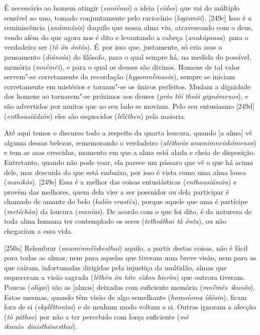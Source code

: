 É necessário ao homem atingir (\emph{suniénai}) a ideia (\emph{eîdos})
que vai do múltiplo sensível ao uno, tomado conjuntamente pelo
raciocínio (\emph{logismôi}). [249c] Isso é a reminiscência
(\emph{anámnêsis}) daquilo que nossa alma viu, atravessando com o deus,
vendo além do que agora nos é dito e levantando a cabeça
(\emph{anakúpsasa})~para o verdadeiro ser (\emph{tò ón óntôs}). É~por
isso que, justamente, só cria asas o pensamento (\emph{diánoia}) do
filósofo, para o qual sempre há, na medida do possível, memória
(\emph{mnḗmêi}), e para o qual os deuses são divinos. Homens de tal
valor servem"-se corretamente da recordação (\emph{hypomnḗmasin}), sempre
se iniciam corretamente em mistérios e tornam"-se os únicos perfeitos.
Mudam a dignidade dos homens ao tornarem"-se próximos aos deuses
(\emph{pròs tôi theôi gignómenos}), e são advertidos por muitos que ao
seu lado se moviam. Pelo seu entusiasmo [249d]
(\emph{enthousiádzôn}) eles são esquecidos (\emph{lélêthen}) pela
maioria.

Até aqui temos o discurso todo a respeito da quarta loucura, quando [a
alma] vê alguma dessas belezas, rememorando o verdadeiro
(\emph{alêthoûs anamimneiskómenos}) e tem as asas crescidas, momento em
que a alma está alada e cheia de disposição. Entretanto, quando não pode
voar, ela parece um pássaro que vê o que há acima dele, mas descuida do
que está embaixo, por isso é vista como uma alma louca (\emph{manikôs}).
[249e] Essa é a melhor das coisas entusiásticas
(\emph{enthousiáseôn}) e provém das melhores, quem dela vier a ser
possuidor ou dela participar é chamado de amante do belo (\emph{kalôn
erastès}), porque aquele que ama é partícipe (\emph{metéchôn}) da
loucura (\emph{manías}). De acordo com o que foi dito, é da natureza de
toda alma humana ter contemplado os seres (\emph{tetheáthai tà ónta}),
ou não chegariam a essa vida.

[250a] Relembrar (\emph{anamimnḗiskesthai}) aquilo, a partir destas
coisas, não é fácil para todas as almas, nem para aquelas que tiveram
uma breve visão, nem para as que caíram, infortunadas dirigidas pela
injustiça da multidão, almas que esqueceram a visão sagrada
(\emph{léthên ôn tóte eîdon hierôn}) que outrora tiveram. Poucas
(\emph{olígai}) são as [almas] deixadas com suficiente memória
(\emph{mnḗmês}~\emph{ikanôs}). Estas mesmas, quando têm visão de algo
semelhante (\emph{homoíoma ídôsin}), ficam fora de si
(\emph{ekplḗttontai}) e de nenhum modo voltam a si. Outras ignoram a
afecção (\emph{tò páthos}) por não a ter percebido com força suficiente
(\emph{mè ikanôs}~\emph{diaisthánesthai}).

